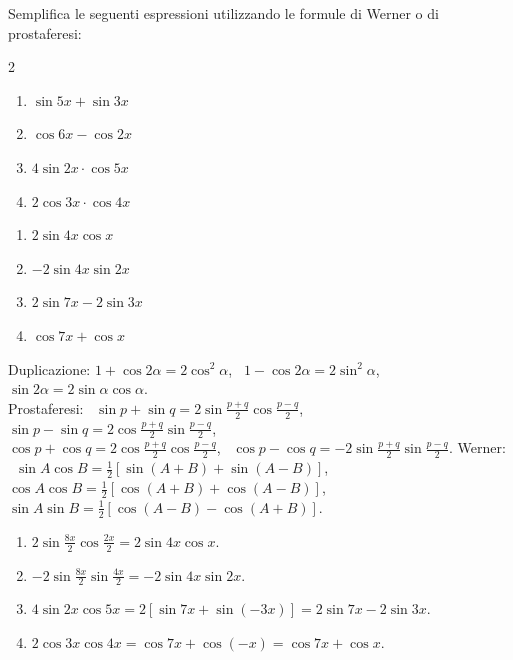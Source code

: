 
\begin{question}[ID=3.4, subtitle={Formule di Werner e prostaferesi — serie 4}, tags={goniometria, prostaferesi, Werner}, difficulty=media]
Semplifica le seguenti espressioni utilizzando le formule di Werner o di prostaferesi:
\begin{multicols}{2}
\begin{enumerate}
\item $\sin 5x + \sin 3x$
\item $\cos 6x - \cos 2x$
\item $4 \sin 2x \cdot \cos 5x$
\item $2 \cos 3x \cdot \cos 4x$
\end{enumerate}
\end{multicols}
\begin{solution}
\begin{enumerate}
    \item $2\sin4x\cos x$
    \item $-2\sin4x\sin2x$
    \item $2\sin7x-2\sin3x$
    \item $\cos7x+\cos x$
\end{enumerate}
\end{solution}
\begin{explanation}
Duplicazione: $1+\cos2\alpha=2\cos^2\alpha$, \ $1-\cos2\alpha=2\sin^2\alpha$, \ $\sin2\alpha=2\sin\alpha\cos\alpha$. \\
Prostaferesi: \ $\sin p+\sin q=2\sin\tfrac{p+q}{2}\cos\tfrac{p-q}{2}$, \ $\sin p-\sin q=2\cos\tfrac{p+q}{2}\sin\tfrac{p-q}{2}$, \\
$\cos p+\cos q=2\cos\tfrac{p+q}{2}\cos\tfrac{p-q}{2}$, \ $\cos p-\cos q=-2\sin\tfrac{p+q}{2}\sin\tfrac{p-q}{2}$.
Werner: \ $\sin A\cos B=\tfrac12[\sin(A+B)+\sin(A-B)]$, \ $\cos A\cos B=\tfrac12[\cos(A+B)+\cos(A-B)]$, \ $\sin A\sin B=\tfrac12[\cos(A-B)-\cos(A+B)]$.
\begin{enumerate}
    \item $2\sin\tfrac{8x}{2}\cos\tfrac{2x}{2}=2\sin4x\cos x$.
    \item $-2\sin\tfrac{8x}{2}\sin\tfrac{4x}{2}=-2\sin4x\sin2x$.
    \item $4\sin2x\cos5x=2\left[\sin7x+\sin(-3x)\right]=2\sin7x-2\sin3x$.
    \item $2\cos3x\cos4x=\cos7x+\cos(-x)=\cos7x+\cos x$.
\end{enumerate}
\end{explanation}
\end{question}

